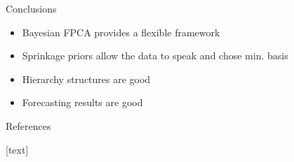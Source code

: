 \documentclass[final]{beamer}
\newlength{\onecolwid}
\begin{document}
\begin{frame}[t]
\begin{columns}[t]
\begin{column}{\onecolwid}
\begin{block}{Conclusions}

\begin{itemize}
\item Bayesian FPCA provides a flexible framework \\
\item Sprinkage priors allow the data to speak and chose min. basis\\
\item Hierarchy structures are good \\
\item Forecasting results are good \\
\end{itemize}

\end{block}


\begin{block}{References}

[text]
\nocite{*}



\end{block}




\end{column} %

\end{columns} %

\end{frame} %
\end{document}
